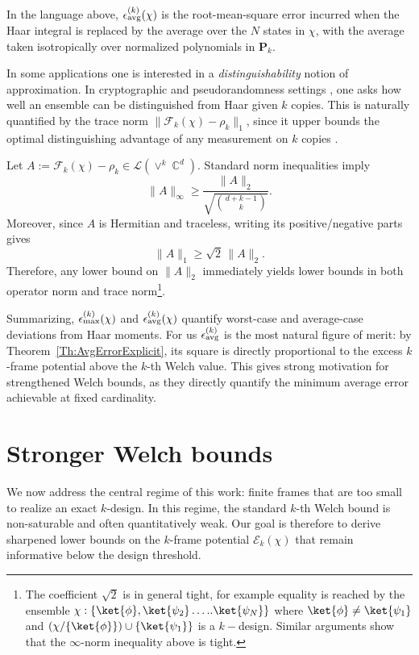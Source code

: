 \documentclass[aps,twocolumn,pra,superscriptaddress,nofootinbib]{revtex4-2}
\DeclareMathOperator{\C}{\mathbb{C}} %
\begin{document}
{In the language above, $\epsilon_{\rm avg}^{(k)}(\chi)$ is the root-mean-square error incurred when the Haar integral is replaced by the average over the $N$ states in $\chi$, with the average taken isotropically over normalized polynomials in $\mathbf P_k$.}

\medskip


In some applications one is interested in a \emph{distinguishability} notion of approximation.
In cryptographic and pseudorandomness settings \cite{Brakerski2019}, one asks how well an ensemble can be distinguished from Haar given \(k\) copies. This is naturally quantified by the trace norm
\(\|\mathcal F_k(\chi)-\rho_k\|_1\), since it upper bounds the optimal distinguishing advantage of any measurement on \(k\) copies \cite{Helstrom1969}.

Let $A:=\mathcal F_k(\chi)-\rho_k\in\mathcal L(\vee^k\C^d)$.
Standard norm inequalities imply
\[
\|A\|_{\infty}\ge \frac{\|A\|_2}{\sqrt{{\binom{d+k-1}{k}}}}.
\]
Moreover, since \(A\) is Hermitian and traceless, writing its positive/negative parts gives
\[
\|A\|_1 \ge \sqrt{2}\,\|A\|_2.
\]
Therefore, any lower bound on \(\|A\|_2\) immediately yields lower bounds in both operator norm and trace norm\footnote{{The coefficient $\sqrt{2}$ is in general tight, for example equality is reached by the ensemble $\chi:\{ \ket{\phi}, \ket{\psi_{2}}\dots..\ket{\psi_{N}}\}$ where $\ket{\phi}\neq \ket{\psi_{1}}$ and $(\chi/\{\ket{\phi}\}) \cup \{\ket{\psi_{1}}\}$ is a $k-$design. Similar arguments show that the $\infty$-norm inequality above is tight.} }.

Summarizing, \(\epsilon_{\rm max}^{(k)}(\chi)\) and \(\epsilon_{\rm avg}^{(k)}(\chi)\) quantify worst-case and average-case deviations from Haar moments. For us \(\epsilon_{\rm avg}^{(k)}\) is the most natural figure of merit: by Theorem~\ref{Th:AvgErrorExplicit}, {its square} is directly proportional to the excess \(k\)-frame potential above the \(k\)-th Welch value. This gives strong motivation for strengthened Welch bounds, as they directly quantify the minimum average error achievable at fixed cardinality.

\section{Stronger Welch bounds}\label{sec:stronger-welch}

We now address the central regime of this work: finite frames that are too small to realize an exact $k$-design.
In this regime, the standard $k$-th Welch bound is non-saturable and often quantitatively weak.
Our goal is therefore to derive sharpened lower bounds on the $k$-frame potential
$\mathcal E_k(\chi)$ that remain informative below the design threshold.
\end{document}

